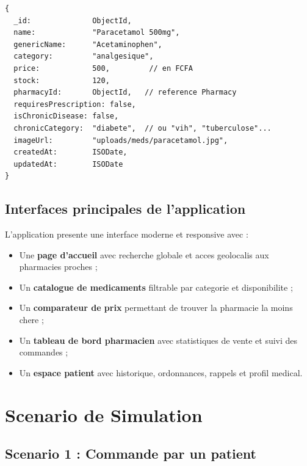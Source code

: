 \documentclass[12pt,a4paper]{report}
\begin{document}
\begin{lstlisting}[caption=Schema simplifie de la collection Medication (MongoDB)]
{
  _id:              ObjectId,
  name:             "Paracetamol 500mg",
  genericName:      "Acetaminophen",
  category:         "analgesique",
  price:            500,         // en FCFA
  stock:            120,
  pharmacyId:       ObjectId,   // reference Pharmacy
  requiresPrescription: false,
  isChronicDisease: false,
  chronicCategory:  "diabete",  // ou "vih", "tuberculose"...
  imageUrl:         "uploads/meds/paracetamol.jpg",
  createdAt:        ISODate,
  updatedAt:        ISODate
}
\end{lstlisting}

\subsection{Interfaces principales de l'application}

L'application presente une interface moderne et responsive avec :

\begin{itemize}[label=\textcolor{vertpharma}{\textbullet}]
    \item Une \textbf{page d'accueil} avec recherche globale et acces geolocalis aux pharmacies proches ;
    \item Un \textbf{catalogue de medicaments} filtrable par categorie et disponibilite ;
    \item Un \textbf{comparateur de prix} permettant de trouver la pharmacie la moins chere ;
    \item Un \textbf{tableau de bord pharmacien} avec statistiques de vente et suivi des commandes ;
    \item Un \textbf{espace patient} avec historique, ordonnances, rappels et profil medical.
\end{itemize}

\section{Scenario de Simulation}

\subsection{Scenario 1 : Commande par un patient}
\end{document}
